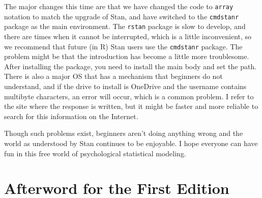 The major changes this time are that we have changed the code to \verb|array| notation to match the upgrade of Stan, and have switched to the \texttt{cmdstanr} package as the main environment. The \texttt{rstan} package is slow to develop, and there are times when it cannot be interrupted, which is a little inconvenient, so we recommend that future (in R) Stan users use the \texttt{cmdstanr} package. The problem might be that the introduction has become a little more troublesome. After installing the package, you need to install the main body and set the path. There is also a major OS that has a mechanism that beginners do not understand, and if the drive to install is OneDrive and the username contains multibyte characters, an error will occur, which is a common problem. I refer to the site where the response is written, but it might be faster and more reliable to search for this information on the Internet.

Though such problems exist, beginners aren't doing anything wrong and the world as understood by Stan continues to be enjoyable. I hope everyone can have fun in this free world of psychological statistical modeling.


\section*{Afterword for the First Edition}

